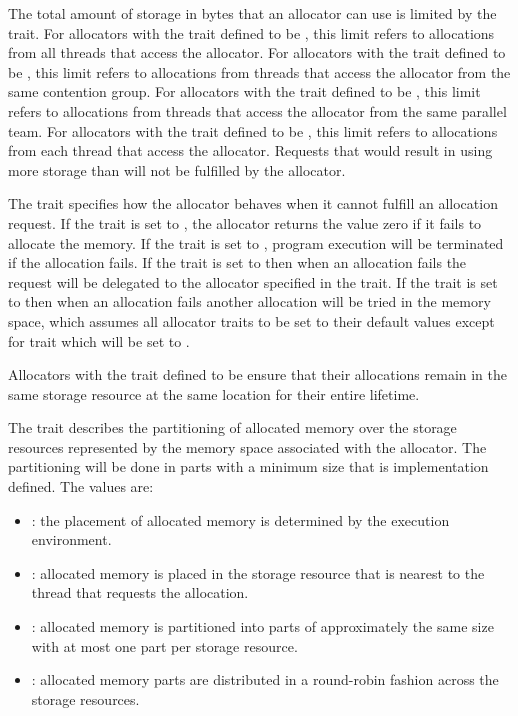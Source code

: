 The total amount of storage in bytes that an allocator can use is limited by 
the {} trait. For allocators with the  trait 
defined to be , this limit refers to allocations from all threads 
that access the allocator. For allocators with the  trait defined 
to be , this limit refers to allocations from threads that access
the allocator from the same contention group. For allocators with the 
 trait defined to be , this limit refers to 
allocations from threads that access the allocator from the same parallel 
team. For allocators with the  trait defined to be ,
this limit refers to allocations from each thread that access the allocator. 
Requests that would result in using more storage than {} 
will not be fulfilled by the allocator.

The  trait specifies how the allocator behaves when it 
cannot fulfill an allocation request. If the  trait is set 
to , the allocator returns the value zero if it fails to 
allocate the memory. If the  trait is set to , 
program execution will be terminated if the allocation fails. If the 
 trait is set to  then when an allocation 
fails the request will be delegated to the allocator specified in the 
 trait. If the  trait is set to 
 then when an allocation fails another allocation 
will be tried in the  memory space, which assumes
all allocator traits to be set to their default values except for 
 trait which will be set to .

Allocators with the  trait defined to be  
ensure that their allocations remain in the same storage resource at 
the same location for their entire lifetime.

The {} trait describes the partitioning of allocated
memory over the storage resources represented by the memory space associated
with the allocator. The partitioning will be done in parts with a minimum size
that is implementation defined. The values are:

\begin{itemize}
\item {}: the placement of allocated memory is determined 
      by the execution environment.
\item {}: allocated memory is placed in the storage resource 
      that is nearest to the thread that requests the allocation.
\item {}: allocated memory is partitioned into parts of 
      approximately the same size with at most one part per storage resource.
\item {}: allocated memory parts are distributed in a 
      round-robin fashion across the storage resources.
\end{itemize}

